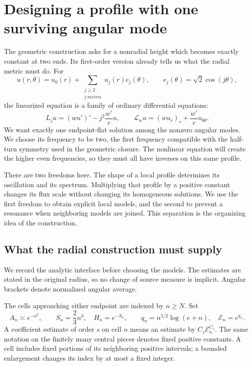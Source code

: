 \section{Designing a profile with one surviving angular mode}
\label{sec:rosen-reference-packet}
\label{sec:radial-models}

The geometric construction asks for a nonradial height which becomes
exactly constant at two ends.  Its first-order version already tells us
what the radial metric must do.  For
\[
 u(r,\theta)=u_0(r)+\sum_{\substack{j\ge2\\j\ {
m even}}}u_j(r)e_j(\theta),
 \qquad e_j(\theta)=\sqrt2\cos(j\theta),
\]
the linearized equation is a family of ordinary differential equations:
\begin{equation}\label{eq:rad-eq-modal-operator}
 L_ju=(wu')'-j^2\frac{w'}r u,
 \qquad
 \mathscr L_wu=(wu_r)_r+\frac{w'}r u_{\theta\theta}.
\end{equation}
We want exactly one endpoint-flat solution among the nonzero angular
modes.  We choose its frequency to be two, the first frequency compatible
with the half-turn symmetry used in the geometric closure.  The
nonlinear equation will create the higher even frequencies, so they
must all have inverses on this same profile.

There are two freedoms here.  The shape of a local profile determines
its oscillation and its spectrum.  Multiplying that profile by a positive
constant changes its flux scale without changing its homogeneous
solutions.  We use the first freedom to obtain explicit local models,
and the second to prevent a resonance when neighboring models are
joined.  This separation is the organizing idea of the construction.

\subsection{What the radial construction must supply}

We record the analytic interface before choosing the models.  The estimates
are stated in the original radius, so no change of source measure is
implicit.  Angular brackets denote normalized angular average.

\begin{definition}\label{def:radial-weights}
The cells approaching either endpoint are indexed by $n\ge N$.  Set
\begin{equation}\label{eq:rad-eq-endpoint-weights}
 A_n\asymp e^{-n^2},\qquad
 S_n=\frac23 n^3,\quad H_n=e^{-S_n},\qquad
 q_n=n^{5/2}\log(e+n),\quad \mathcal E_n=e^{q_n}.
\end{equation}
A coefficient estimate of order $s$ on cell $n$ means an estimate by
$C_s\mathcal E_n^{C_s}$.  The same notation on the finitely many central
pieces denotes fixed positive constants.  A cell includes fixed portions
of its neighboring positive intervals; a bounded enlargement changes
its index by at most a fixed integer.
\end{definition}


